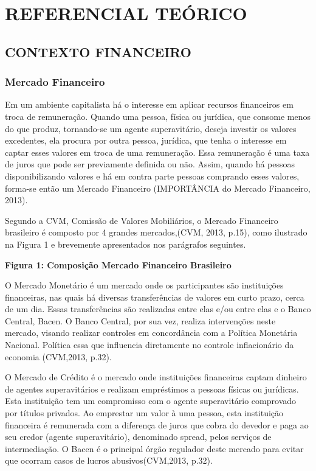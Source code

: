 \chapter[REFERENCIAL TEORICO]{REFERENCIAL TEÓRICO}
\section{CONTEXTO FINANCEIRO}
\subsection{Mercado Financeiro}

Em um ambiente capitalista há o interesse em aplicar recursos financeiros em troca de remuneração. Quando uma pessoa, física ou jurídica, que consome menos do que produz, tornando-se um agente superavitário, deseja investir os valores excedentes, ela procura por outra pessoa, jurídica, que tenha o interesse em captar esses valores em troca de uma remuneração. Essa remuneração é uma taxa de juros que pode ser previamente definida ou não. Assim, quando há pessoas disponibilizando valores e há em contra parte pessoas comprando esses valores, forma-se então um Mercado Financeiro (IMPORTÂNCIA do Mercado Financeiro, 2013).

Segundo a CVM, Comissão de Valores Mobiliários, o Mercado Financeiro brasileiro é composto por 4 grandes mercados,(CVM, 2013, p.15), como ilustrado na Figura 1 e brevemente apresentados nos parágrafos seguintes.

\textbf{Figura 1: Composição Mercado Financeiro Brasileiro}

O Mercado Monetário é um mercado onde os participantes são instituições financeiras, nas quais há diversas transferências de valores em curto prazo, cerca de um dia. Essas transferências são realizadas entre elas e/ou entre elas e o Banco Central, Bacen. O Banco Central, por sua vez, realiza intervenções neste mercado, visando realizar controles em concordância com a Política Monetária Nacional. Política essa que influencia diretamente no controle inflacionário da economia (CVM,2013, p.32).

O Mercado de Crédito é o mercado onde instituições financeiras captam dinheiro de agentes superavitários e realizam empréstimos a pessoas físicas ou jurídicas. Esta instituição tem um compromisso com o agente superavitário comprovado por títulos privados. Ao emprestar um valor à uma pessoa, esta instituição financeira é remunerada com a diferença de juros que cobra do devedor e paga ao seu credor (agente superavitário), denominado spread, pelos serviços de intermediação. O Bacen é o principal órgão regulador deste mercado para evitar que ocorram casos de lucros abusivos(CVM,2013, p.32).

